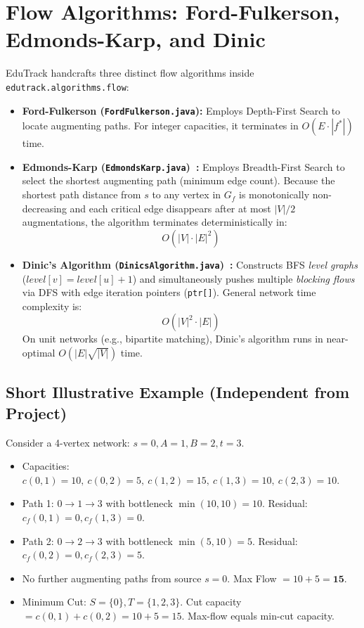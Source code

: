 \section{Flow Algorithms: Ford-Fulkerson, Edmonds-Karp, and Dinic}
EduTrack handcrafts three distinct flow algorithms inside \texttt{edutrack.algorithms.flow}:
\begin{itemize}
    \item \textbf{Ford-Fulkerson (\texttt{FordFulkerson.java}):} Employs Depth-First Search to locate augmenting paths. For integer capacities, it terminates in $O(E \cdot |f^*|)$ time.
    \item \textbf{Edmonds-Karp (\texttt{EdmondsKarp.java})~\cite{edmondskarp1972}:} Employs Breadth-First Search to select the shortest augmenting path (minimum edge count). Because the shortest path distance from $s$ to any vertex in $G_f$ is monotonically non-decreasing and each critical edge disappears after at most $|V|/2$ augmentations, the algorithm terminates deterministically in:
    \begin{equation}
    O(|V| \cdot |E|^2)
    \end{equation}
    \item \textbf{Dinic's Algorithm (\texttt{DinicsAlgorithm.java})~\cite{dinic1970}:} Constructs BFS \textit{level graphs} ($level[v] = level[u] + 1$) and simultaneously pushes multiple \textit{blocking flows} via DFS with edge iteration pointers (\texttt{ptr[]}). General network time complexity is:
    \begin{equation}
    O(|V|^2 \cdot |E|)
    \end{equation}
    On unit networks (e.g., bipartite matching), Dinic's algorithm runs in near-optimal $O(|E| \sqrt{|V|})$ time.
\end{itemize}

\subsection{Short Illustrative Example (Independent from Project)}
Consider a 4-vertex network: $s=0, A=1, B=2, t=3$.
\begin{itemize}
    \item Capacities: $c(0, 1) = 10, \ c(0, 2) = 5, \ c(1, 2) = 15, \ c(1, 3) = 10, \ c(2, 3) = 10$.
    \item Path 1: $0 \to 1 \to 3$ with bottleneck $\min(10, 10) = 10$. Residual: $c_f(0, 1) = 0, c_f(1, 3) = 0$.
    \item Path 2: $0 \to 2 \to 3$ with bottleneck $\min(5, 10) = 5$. Residual: $c_f(0, 2) = 0, c_f(2, 3) = 5$.
    \item No further augmenting paths from source $s=0$. Max Flow $= 10 + 5 = \mathbf{15}$.
    \item Minimum Cut: $S = \{0\}, T = \{1, 2, 3\}$. Cut capacity $= c(0, 1) + c(0, 2) = 10 + 5 = 15$. Max-flow equals min-cut capacity.
\end{itemize}

